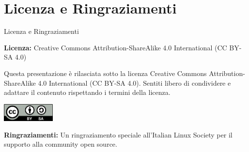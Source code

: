 \documentclass{beamer}
\newcommand{\license}{Creative Commons Attribution-ShareAlike 4.0 International (CC BY-SA 4.0)}
\begin{document}
	\section*{Licenza e Ringraziamenti}
	\begin{frame}{Licenza e Ringraziamenti}
		\begin{center}
			\textbf{Licenza:} \license %
			
			\vspace{1em}
			
			Questa presentazione è rilasciata sotto la licenza \license. Sentiti libero di condividere e adattare il contenuto rispettando i termini della licenza.
			
			\vspace{1.5em}
			
			\includegraphics[width=0.2\textwidth]{images/cc-by-sa.png} %
			
			\vspace{1.5em}
			
			\textbf{Ringraziamenti:} Un ringraziamento speciale all'Italian Linux Society per il supporto alla community open source.
		\end{center}
	\end{frame}
	
\end{document}
